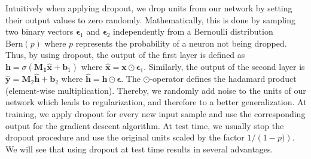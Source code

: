 \documentclass[runningheads]{llncs}
\begin{document}
Intuitively when applying dropout, we drop units from our network by setting their output values to zero randomly.
Mathematically, this is done by sampling two binary vectors $\boldsymbol{\epsilon}_1$ and $\boldsymbol{\epsilon}_2$ independently from a Bernoulli distribution $\mathrm{Bern}(p)$ where $p$ represents the probability of a neuron not being dropped.
Thus, by using dropout, the output of the first layer is defined as $\mathbf{h} = \sigma\left( \mathbf{M_1}\hat{\mathbf{x}} + \mathbf{b}_1\right)$ where $\hat{\mathbf{x}} = \mathbf{x} \odot \boldsymbol{\epsilon}_1$.
Similarly, the output of the second layer is $\hat{\mathbf{y}} = \mathbf{M}_2\hat{\mathbf{h}} + \mathbf{b}_2$ where $\hat{\mathbf{h}} = \mathbf{h} \odot \boldsymbol{\epsilon}$.
The $\odot$-operator defines the hadamard product (element-wise multiplication).
Thereby, we randomly add noise to the units of our network which leads to regularization, and therefore to a better generalization.
At training, we apply dropout for every new input sample and use the corresponding output for the gradient descent algorithm.
At test time, we usually stop the dropout procedure and use the original units scaled by the factor $1 / \left(1 - p)\right)$. 
We will see that using dropout at test time results in several advantages.
\end{document}
